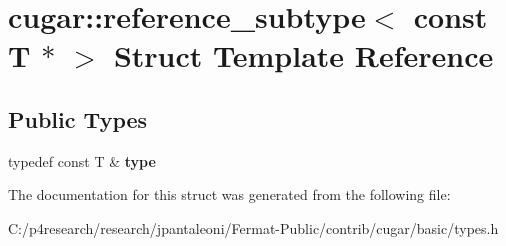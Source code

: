 \hypertarget{structcugar_1_1reference__subtype_3_01const_01_t_01_5_01_4}{}\section{cugar\+:\+:reference\+\_\+subtype$<$ const T $\ast$ $>$ Struct Template Reference}
\label{structcugar_1_1reference__subtype_3_01const_01_t_01_5_01_4}
\subsection*{Public Types}
\begin{DoxyCompactItemize}
\item 
\mbox{\label{structcugar_1_1reference__subtype_3_01const_01_t_01_5_01_4_abcac0c2a0f6605210333cc3a792043b0}} 
typedef const T \& {\bfseries type}
\end{DoxyCompactItemize}


The documentation for this struct was generated from the following file\+:\begin{DoxyCompactItemize}
\item 
C\+:/p4research/research/jpantaleoni/\+Fermat-\/\+Public/contrib/cugar/basic/types.\+h\end{DoxyCompactItemize}
